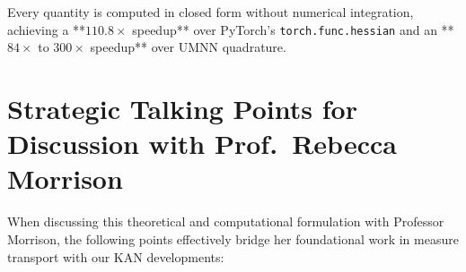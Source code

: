 \documentclass[11pt,a4paper]{article}
\theoremstyle{plain}
\theoremstyle{definition}
\theoremstyle{remark}
\begin{document}
Every quantity is computed in closed form without numerical integration, achieving a **$110.8\times$ speedup** over PyTorch's \texttt{torch.func.hessian} and an **$84\times$ to $300\times$ speedup** over UMNN quadrature.

\section{Strategic Talking Points for Discussion with Prof.~Rebecca Morrison}

When discussing this theoretical and computational formulation with Professor Morrison, the following points effectively bridge her foundational work in measure transport with our KAN developments:
\end{document}
